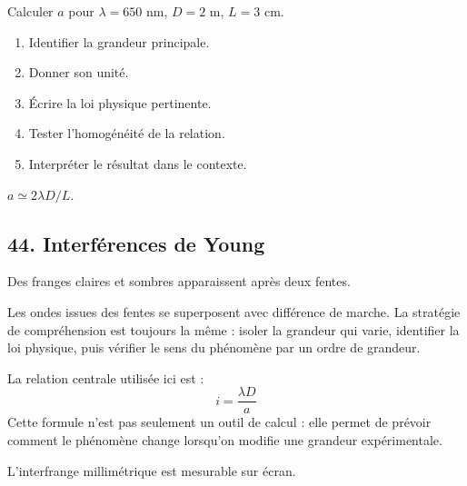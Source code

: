 \documentclass[11pt,a4paper]{article}
\begin{document}
\begin{exercicebox}
Calculer $a$ pour $\lambda=650$ nm, $D=2$ m, $L=3$ cm.
\begin{enumerate}
  \item Identifier la grandeur principale.
  \item Donner son unité.
  \item Écrire la loi physique pertinente.
  \item Tester l'homogénéité de la relation.
  \item Interpréter le résultat dans le contexte.
\end{enumerate}
\end{exercicebox}

\begin{corrigebox}[Indication]
$a\simeq 2\lambda D/L$.
\end{corrigebox}


\subsection{44. Interférences de Young}

\begin{exemplebox}
Des franges claires et sombres apparaissent après deux fentes.
\end{exemplebox}

\begin{methodebox}
Les ondes issues des fentes se superposent avec différence de marche.
La stratégie de compréhension est toujours la même : isoler la grandeur qui varie, identifier la loi physique, puis vérifier le sens du phénomène par un ordre de grandeur.
\end{methodebox}

\begin{theorembox}
La relation centrale utilisée ici est :
\[
i=\frac{\lambda D}{a}
\]
Cette formule n'est pas seulement un outil de calcul : elle permet de prévoir comment le phénomène change lorsqu'on modifie une grandeur expérimentale.
\end{theorembox}

\begin{odgbox}
L'interfrange millimétrique est mesurable sur écran.
\end{odgbox}
\end{document}
